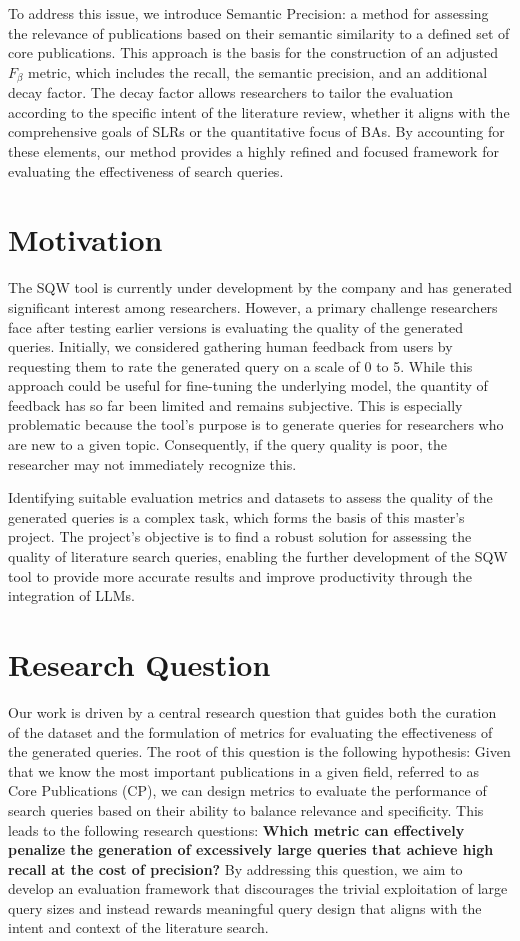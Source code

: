 To address this issue, we introduce Semantic Precision: a method for assessing the relevance of publications based on their semantic similarity to a defined set of core publications. This approach is the basis for the construction of an adjusted $F_\beta$ metric, which includes the recall, the semantic precision, and an additional decay factor. The decay factor allows researchers to tailor the evaluation according to the specific intent of the literature review, whether it aligns with the comprehensive goals of SLRs or the quantitative focus of BAs. By accounting for these elements, our method provides a highly refined and focused framework for evaluating the effectiveness of search queries.

\section{Motivation}
The SQW tool is currently under development by the company and has generated significant interest among researchers. However, a primary challenge researchers face after testing earlier versions is evaluating the quality of the generated queries. Initially, we considered gathering human feedback from users by requesting them to rate the generated query on a scale of 0 to 5. While this approach could be useful for fine-tuning the underlying model, the quantity of feedback has so far been limited and remains subjective. This is especially problematic because the tool’s purpose is to generate queries for researchers who are new to a given topic. Consequently, if the query quality is poor, the researcher may not immediately recognize this.

Identifying suitable evaluation metrics and datasets to assess the quality of the generated queries is a complex task, which forms the basis of this master's project. The project’s objective is to find a robust solution for assessing the quality of literature search queries, enabling the further development of the SQW tool to provide more accurate results and improve productivity through the integration of LLMs.


\section{Research Question}\label{sec:researchQuestions}

Our work is driven by a central research question that guides both the curation of the dataset and the formulation of metrics for evaluating the effectiveness of the generated queries. The root of this question is the following hypothesis: Given that we know the most important publications in a given field, referred to as Core Publications (CP), we can design metrics to evaluate the performance of search queries based on their ability to balance relevance and specificity. This leads to the following research questions: \textbf{Which metric can effectively penalize the generation of excessively large queries that achieve high recall at the cost of precision?} By addressing this question, we aim to develop an evaluation framework that discourages the trivial exploitation of large query sizes and instead rewards meaningful query design that aligns with the intent and context of the literature search.


